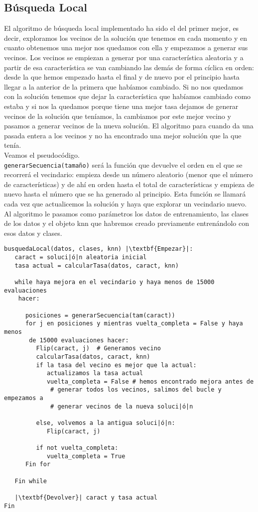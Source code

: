 \documentclass[12pt]{article}
\begin{document}
\subsection{Búsqueda Local}
El algoritmo de búsqueda local implementado ha sido el del primer mejor, es decir, exploramos los vecinos de la solución que tenemos en cada momento y en cuanto obtenemos una mejor nos quedamos con ella y empezamos a generar sus vecinos. Los vecinos se empiezan a generar por una característica aleatoria y a partir de esa característica se van cambiando las demás de forma cíclica en orden: desde la que hemos empezado hasta el final y de nuevo por el principio hasta llegar a la anterior de la primera que habíamos cambiado. Si no nos quedamos con la solución tenemos que dejar la característica que habíamos cambiado como estaba y si nos la quedamos porque tiene una mejor tasa dejamos de generar vecinos de la solución que teníamos, la cambiamos por este mejor vecino y pasamos a generar vecinos de la nueva solución. El algoritmo para cuando da una pasada entera a los vecinos y no ha encontrado una mejor solución que la que tenía.\\

Veamos el pseudocódigo.\\
\texttt{generarSecuencia(tamaño)} será la función que devuelve el orden en el que se recorrerá el vecindario: empieza desde un número aleatorio (menor que el número de características) y de ahí en orden hasta el total de características y empieza de nuevo hasta el número que se ha generado al principio. Esta función se llamará cada vez que actualicemos la solución y haya que explorar un vecindario nuevo.\\
Al algoritmo le pasamos como parámetros los datos de entrenamiento, las clases de los datos y el objeto knn que habremos creado previamente entrenándolo con esos datos y clases.
\begin{lstlisting}
busquedaLocal(datos, clases, knn) |\textbf{Empezar}|:
   caract = soluci|ó|n aleatoria inicial
   tasa actual = calcularTasa(datos, caract, knn)
   
   while haya mejora en el vecindario y haya menos de 15000 evaluaciones
    hacer:
      
      posiciones = generarSecuencia(tam(caract))
      for j en posiciones y mientras vuelta_completa = False y haya menos
       de 15000 evaluaciones hacer:
         Flip(caract, j)  # Generamos vecino
         calcularTasa(datos, caract, knn)
         if la tasa del vecino es mejor que la actual:
            actualizamos la tasa actual
            vuelta_completa = False # hemos encontrado mejora antes de
             # generar todos los vecinos, salimos del bucle y empezamos a 
             # generar vecinos de la nueva soluci|ó|n
         
         else, volvemos a la antigua soluci|ó|n:
            Flip(caract, j)
            
         if not vuelta_completa:
            vuelta_completa = True
      Fin for
   
   Fin while
   
   |\textbf{Devolver}| caract y tasa actual
Fin
   
\end{lstlisting}
\end{document}
